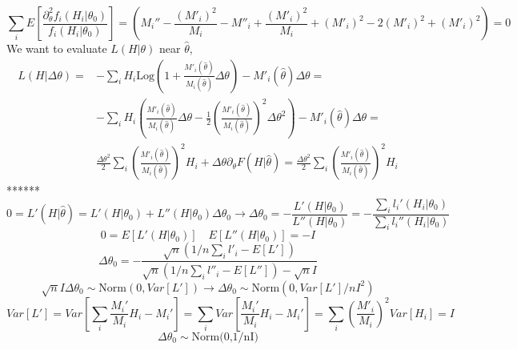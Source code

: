 \documentclass[12pt]{report}
\begin{document}
\begin{equation}
\sum_iE\left[\frac{\partial^2_\theta f_i(H_i|\theta_0)}{f_i(H_i|\theta_0)}\right]=\left(M_i''-\frac{(M'_i)^2}{M_i}-M''_i+\frac{(M'_i)^2}{M_i}+(M'_i)^2-2(M'_i)^2+(M'_i)^2\right)=0
\end{equation}
We want to evaluate $L(H|\theta)$ near $\hat{\theta}$,
\begin{equation}
\begin{split}
L(H|\Delta\theta)=&-\sum_iH_i\text{Log}\left(1+\frac{M'_i(\hat{\theta})}{M_i(\hat\theta)}\Delta\theta\right)-M'_i(\hat{\theta})\Delta\theta=\\
&-\sum_iH_i\left(\frac{M'_i(\hat{\theta})}{M_i(\hat{\theta})}\Delta\theta-\frac{1}{2}\left(\frac{M'_i(\hat{\theta})}{M_i(\hat{\theta})}\right)^2\Delta\theta^2\right)-M'_i(\hat{\theta})\Delta\theta=\\
&\frac{\Delta\theta^2}{2}\sum_i\left(\frac{M'_i(\hat{\theta})}{M_i(\hat{\theta})}\right)^2H_i+\Delta\theta\partial_\theta F(H|\hat{\theta})=\frac{\Delta\theta^2}{2}\sum_i\left(\frac{M'_i(\hat{\theta})}{M_i(\hat{\theta})}\right)^2H_i
\end{split}
\end{equation}
******
\begin{equation}
0=L'(H|\hat{\theta})=L'(H|\theta_0)+L''(H|\theta_0)\Delta\theta_0 \rightarrow \Delta\theta_0=-\frac{L'(H|\theta_0)}{L''(H|\theta_0)}=-\frac{\sum_il_i'(H_i|\theta_0)}{\sum_il_i''(H_i|\theta_0)}
\end{equation}
\begin{equation}
0=E[L'(H|\theta_0)] \quad E[L''(H|\theta_0)]=-I
\end{equation}
\begin{equation}
\Delta\theta_0=-\frac{\sqrt{n}(1/n\sum_il'_i-E[L'])}{\sqrt{n}(1/n\sum_il''_i-E[L''])-\sqrt{n}I}
\end{equation}
\begin{equation}
\sqrt{n}I\Delta\theta_0\sim\text{Norm}(0,Var[L']) \rightarrow\Delta\theta_0\sim\text{Norm}(0,Var[L']/nI^2)
\end{equation}
\begin{equation}
Var[L']=Var[\sum_i\frac{M_i'}{M_i}H_i-M_i']=\sum_iVar[\frac{M_i'}{M_i}H_i-M_i']=\sum_i\left(\frac{M'_i}{M_i}\right)^2Var[H_i]=I
\end{equation}
\begin{equation}
\Delta\theta_0\sim\text{Norm(0,1/nI)}
\end{equation}

 
\end{document}

